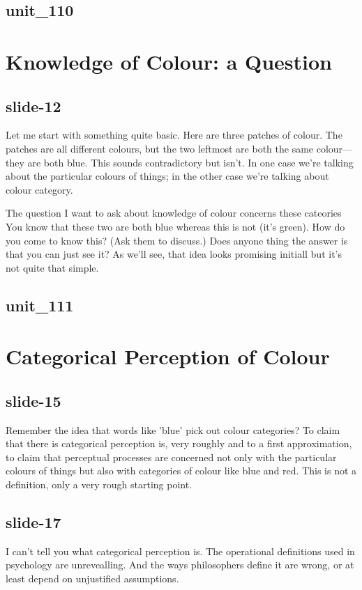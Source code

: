 \documentclass[12pt,\papersize]{extarticle}
\begin{document}
 
\subsection{unit\_110}
 
\section{Knowledge of Colour: a Question}
 
 
\subsection{slide-12}
Let me start with something quite basic.
Here are three patches of colour.
The patches are all different colours, but the two leftmost are both the same colour---they are both blue.
This sounds contradictory but isn't.
In one case we're talking about the particular colours of things; in the other case we're talking about colour category.
 
The question I want to ask about knowledge of colour concerns these cateories
You know that these two are both blue whereas this is not (it's green).
How do you come to know this?
(Ask them to discuss.)
Does anyone thing the answer is that you can just see it? As we'll see, that idea looks promising initiall but it's not quite that simple.
 
 
\subsection{unit\_111}
 
\section{Categorical Perception of Colour}
 
 
\subsection{slide-15}
Remember the idea that words like 'blue' pick out colour categories?
To claim that there is categorical perception is, very roughly and to a first approximation, to claim that perceptual processes are concerned not only with the particular colours of things but also with categories of colour like blue and red.
This is not a definition, only a very rough starting point.
 
 
\subsection{slide-17}
I can't tell you what categorical perception is.
The operational definitions used in psychology are unrevealling.
And the ways philosophers define it are wrong, or at least depend on unjustified assumptions.
 
\end{document}

